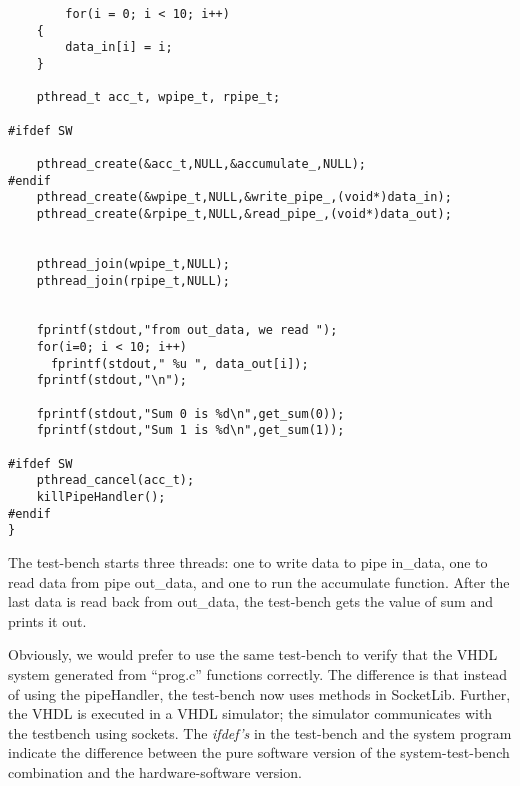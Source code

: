 \documentclass{article}
\begin{document}
\begin{verbatim}
        for(i = 0; i < 10; i++)
	{
		data_in[i] = i;
	}

	pthread_t acc_t, wpipe_t, rpipe_t;

#ifdef SW

	pthread_create(&acc_t,NULL,&accumulate_,NULL);
#endif
	pthread_create(&wpipe_t,NULL,&write_pipe_,(void*)data_in);
	pthread_create(&rpipe_t,NULL,&read_pipe_,(void*)data_out);


	pthread_join(wpipe_t,NULL);
	pthread_join(rpipe_t,NULL);


 	fprintf(stdout,"from out_data, we read ");
	for(i=0; i < 10; i++)
 	  fprintf(stdout," %u ", data_out[i]);
	fprintf(stdout,"\n");

	fprintf(stdout,"Sum 0 is %d\n",get_sum(0));
	fprintf(stdout,"Sum 1 is %d\n",get_sum(1));

#ifdef SW
	pthread_cancel(acc_t);
	killPipeHandler();
#endif
}
\end{verbatim}
The test-bench starts
three threads: one to write data to pipe in\_data, one
to read data from pipe out\_data, and one to run the
accumulate function.  After the last data is read back
from out\_data, the test-bench gets the value of sum
and prints it out. 


Obviously, we would prefer to use the same test-bench
to verify that the VHDL system generated from ``prog.c'' 
functions correctly.  
The difference is that instead of using the pipeHandler,
the test-bench now uses methods in SocketLib.  Further, the
VHDL is executed in a VHDL simulator; the simulator communicates
with the testbench using sockets.
The {\em ifdef's} in the test-bench and the system program
indicate the difference between the pure software version
of the system-test-bench combination and the hardware-software
version.  
\end{document}
